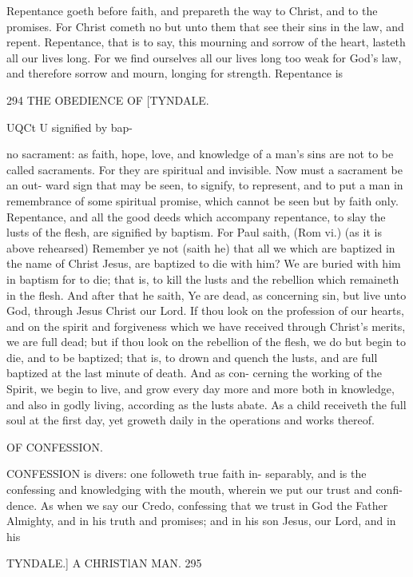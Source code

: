 \documentclass{custom}
\begin{document}
{{Repentance goeth before faith, and prepareth the way
to Christ, and to the promises. For Christ cometh no
but unto them that see their sins in the law, and repent. 
Repentance, that is to say, this mourning and sorrow of 
the heart, lasteth all our lives long. For we find ourselves 
all our lives long too weak for God's law, and therefore 
sorrow and mourn, longing for strength. Repentance is 


294
THE OBEDIENCE OF
[TYNDALE.

UQCt U 
signified 
by bap- 

no sacrament: as faith, hope, love, and knowledge of a 
man's sins are not to be called sacraments. For they are 
spiritual and invisible. Now must a sacrament be an out- 
ward sign that may be seen, to signify, to represent, and 
to put a man in remembrance of some spiritual promise, 
which cannot be seen but by faith only. Repentance, 
and all the good deeds which accompany repentance, to 
slay the lusts of the flesh, are signified by baptism. For 
Paul saith, (Rom vi.) (as it is above rehearsed) Remember 
ye not (saith he) that all we which are baptized in the 
name of Christ Jesus, are baptized to die with him? We 
are buried with him in baptism for to die; that is, to kill
the lusts and the rebellion which remaineth in the flesh.
And after that he saith, Ye are dead, as concerning sin, 
but live unto God, through Jesus Christ our Lord. If 
thou look on the profession of our hearts, and on the 
spirit and forgiveness which we have received through 
Christ's merits, we are full dead; but if thou look on the 
rebellion of the flesh, we do but begin to die, and to be 
baptized; that is, to drown and quench the lusts, and are 
full baptized at the last minute of death. And as con- 
cerning the working of the Spirit, we begin to live, and 
grow every day more and more both in knowledge, and 
also in godly living, according as the lusts abate. As a 
child receiveth the full soul at the first day, yet groweth 
daily in the operations and works thereof. 


OF CONFESSION. 

CONFESSION is divers: one followeth true faith in- 
separably, and is the confessing and knowledging 
with the mouth, wherein we put our trust and confi- 
dence. As when we say our Credo, confessing that we 
trust in God the Father Almighty, and in his truth and 
promises; and in his son Jesus, our Lord, and in his 


TYNDALE.]
A CHRISTlAN MAN.
295

}}
\end{document}
